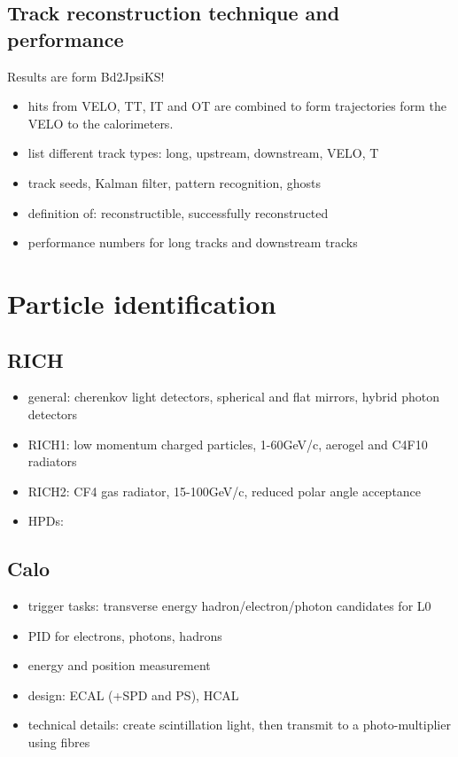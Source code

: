 \subsection{Track reconstruction technique and performance}
Results are form Bd2JpsiKS!
\begin{itemize}
  \item hits from VELO, TT, IT and OT are combined to form trajectories form the VELO to the calorimeters. 
  \item list different track types: long, upstream, downstream, VELO, T
  \item track seeds, Kalman filter, pattern recognition, ghosts
  \item definition of: reconstructible, successfully reconstructed
  \item performance numbers for long tracks and downstream tracks
\end{itemize}

\section{Particle identification}
\subsection{RICH}
\begin{itemize}
  \item general: cherenkov light detectors, spherical and flat mirrors, hybrid photon detectors
  \item RICH1: low momentum charged particles, 1-60GeV/c, aerogel and C4F10 radiators
  \item RICH2: CF4 gas radiator, 15-100GeV/c, reduced polar angle acceptance
  \item HPDs: 
\end{itemize}
\subsection{Calo}
\begin{itemize}
  \item trigger tasks: transverse energy hadron/electron/photon candidates for L0
  \item PID for electrons, photons, hadrons
  \item energy and position measurement
  \item design: ECAL (+SPD and PS), HCAL
  \item technical details: create scintillation light, then transmit to a photo-multiplier using fibres
\end{itemize}
